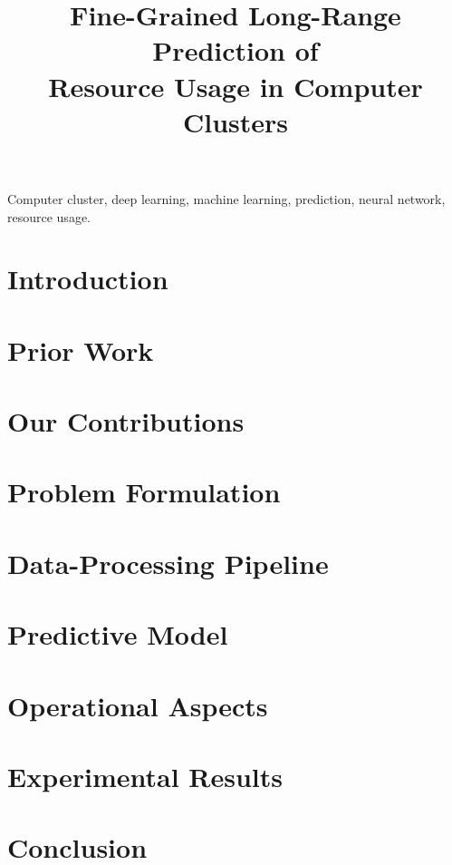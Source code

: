 \documentclass[journal]{IEEEtran}
\title{
  Fine-Grained Long-Range Prediction of\\
  Resource Usage in Computer Clusters
}
\author{}
\begin{document}
  \maketitle

  \begin{abstract}
    
  \end{abstract}

  \begin{IEEEkeywords}
    Computer cluster,
    deep learning,
    machine learning,
    prediction,
    neural network,
    resource usage.
  \end{IEEEkeywords}


  \section{Introduction} 
  

  \section{Prior Work} 
  

  \section{Our Contributions} 
  

  \section{Problem Formulation} 
  

  \section{Data-Processing Pipeline} 
  

  \section{Predictive Model} 
  

  \section{Operational Aspects} 
  

  \section{Experimental Results} 
  

  \section{Conclusion} 
  

  
  
\end{document}
